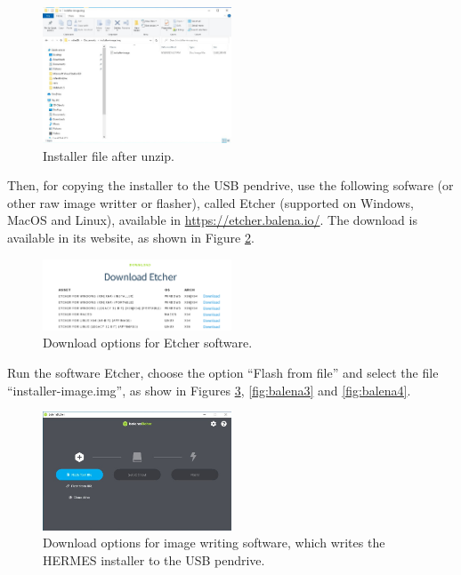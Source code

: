 \documentclass[11pt,a4paper]{article}
\begin{document}
\begin{figure}[H]
  \centering
  \includegraphics[width=0.5\textwidth]{pictures/extract-3-ed.jpg}
  \caption{Installer file after unzip.}
  \label{fig:extract3}
\end{figure}

Then, for copying the installer to the USB pendrive, use the following sofware (or other raw image writter or flasher), called
Etcher (supported on Windows, MacOS and Linux), available in \url{https://etcher.balena.io/}. The download is available in its website,
as shown in Figure \ref{fig:balena1}.

\begin{figure}[H]
  \centering
  \includegraphics[width=0.5\textwidth]{pictures/balena-1.png}
  \caption{Download options for Etcher software.}
  \label{fig:balena1}
\end{figure}

Run the software Etcher, choose the option ``Flash from file'' and select the file ``installer-image.img'', as show in Figures \ref{fig:balena2}, \ref{fig:balena3} and \ref{fig:balena4}.

\begin{figure}[H]
  \centering
  \includegraphics[width=0.5\textwidth]{pictures/balena-2-ed.jpg}
  \caption{Download options for image writing software, which writes the HERMES installer to the USB pendrive.}
  \label{fig:balena2}
\end{figure}
\end{document}

